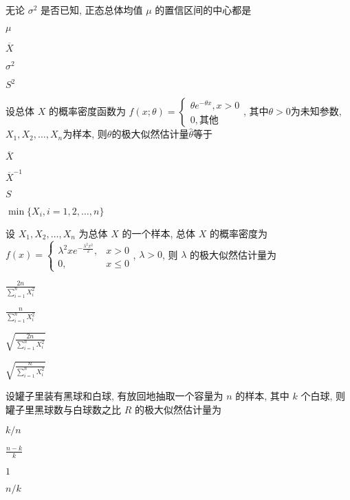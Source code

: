 \documentclass{exam-zh}
\begin{document}
\begin{question}
  无论 $\sigma^2$ 是否已知, 正态总体均值 $\mu$ 的置信区间的中心都是 \paren[B]
  
  \begin{choices}
    \item $\mu$
    \item $\overline{X}$
    \item $\sigma^2$
    \item $S^2$
  \end{choices}
\end{question}

\begin{question}
  设总体 $X$ 的概率密度函数为 $f(x;\theta) = \begin{cases} \theta e^{-\theta x},x>0 \\ 0, \text{其他} \end{cases} $, 其中$\theta>0$为未知参数, $X_1, X_2, \dots, X_n$为样本, 则$\theta$的极大似然估计量$\hat{\theta}$等于\paren[B]
    
  \begin{choices}
      \item $\overline{X}$
      \item $\overline{X}^{-1}$
      \item $S$
      \item $\min\{X_i, i=1, 2, \dots, n\}$
    \end{choices}
\end{question}

\begin{question}
  设 $X_1, X_2, \dots, X_n$ 为总体 $X$ 的一个样本, 总体 $X$ 的概率密度为 $f(x) = \begin{cases} \lambda^2 x e^{-\frac{\lambda^2 x^2}{2}}, & x > 0 \\ 0, & x \le 0 \end{cases}$, $\lambda > 0$, 则 $\lambda$ 的极大似然估计量为\paren[C]
  
  \begin{choices}
    \item $\frac{2n}{\sum_{i=1}^{n}X_i^2}$
    \item $\frac{n}{\sum_{i=1}^{n}X_i^2}$
    \item $\sqrt{\frac{2n}{\sum_{i=1}^{n}X_i^2}}$
    \item $\sqrt{\frac{n}{\sum_{i=1}^{n}X_i^2}}$
  \end{choices}
\end{question}

\begin{question}
  设罐子里装有黑球和白球, 有放回地抽取一个容量为 $n$ 的样本, 其中 $k$ 个白球, 则罐子里黑球数与白球数之比 $R$ 的极大似然估计量为 \paren[B]
  
  \begin{choices}
    \item $k/n$
    \item $\frac{n-k}{k}$
    \item $1$
    \item $n/k$
  \end{choices}
\end{question}
\end{document}
